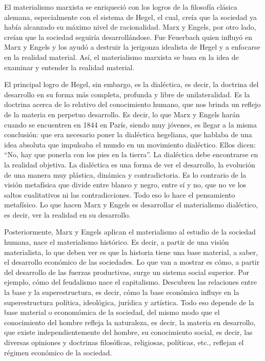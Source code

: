 \documentclass[
  a4paper,
]{article}
\begin{document}
El materialismo marxista se enriqueció con los logros de la filosofía
clásica alemana, especialmente con el sistema de Hegel, el cual, creía
que la sociedad ya había alcanzado su máximo nivel de racionalidad. Marx
y Engels, por otro lado, creían que la sociedad seguiría
desarrollándose. Fue Feuerbach quien influyó en Marx y Engels y los
ayudó a destruir la jerigonza idealista de Hegel y a enfocarse en la
realidad material. Así, el materialismo marxista se basa en la idea de
examinar y entender la realidad material.

El principal logro de Hegel, sin embargo, es la dialéctica, es decir, la
doctrina del desarrollo en su forma más completa, profunda y libre de
unilateralidad. Es la doctrina acerca de lo relativo del conocimiento
humano, que nos brinda un reflejo de la materia en perpetuo desarrollo.
Es decir, lo que Marx y Engels harán cuando se encuentren en 1844 en
París, siendo muy jóvenes, es llegar a la misma conclusión: que era
necesario poner la dialéctica hegeliana, que hablaba de una idea
absoluta que impulsaba el mundo en un movimiento dialéctico. Ellos
dicen: ``No, hay que ponerla con los pies en la tierra''. La dialéctica
debe encontrarse en la realidad objetiva. La dialéctica es una forma de
ver el desarrollo, la evolución de una manera muy plástica, dinámica y
contradictoria. Es lo contrario de la visión metafísica que divide entre
blanco y negro, entre sí y no, que no ve los saltos cualitativos ni las
contradicciones. Todo eso lo hace el pensamiento metafísico. Lo que
hacen Marx y Engels es desarrollar el materialismo dialéctico, es decir,
ver la realidad en su desarrollo.

Posteriormente, Marx y Engels aplican el materialismo al estudio de la
sociedad humana, nace el materialismo histórico. Es decir, a partir de
una visión materialista, lo que deben ver es que la historia tiene una
base material, a saber, el desarrollo económico de las sociedades. Lo
que van a mostrar es cómo, a partir del desarrollo de las fuerzas
productivas, surge un sistema social superior. Por ejemplo, cómo del
feudalismo nace el capitalismo. Descubren las relaciones entre la base y
la superestructura, es decir, cómo la base económica influye en la
superestructura política, ideológica, jurídica y artística. Todo eso
depende de la base material o economómica de la sociedad, del mismo modo
que el conocimiento del hombre refleja la naturaleza, es decir, la
materia en desarrollo, que existe independientemente del hombre, su
conocimiento social, es decir, las diversas opiniones y doctrinas
filosóficas, religiosas, políticas, etc., reflejan el régimen económico
de la sociedad.
\end{document}
